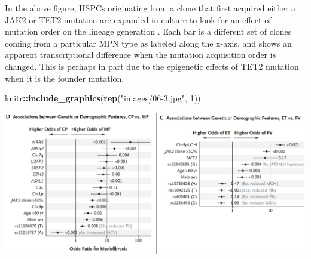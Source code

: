 \documentclass[]{book}
\newenvironment{Shaded}{\begin{snugshade}}{\end{snugshade}}
\newcommand{\KeywordTok}[1]{\textcolor[rgb]{0.13,0.29,0.53}{\textbf{#1}}}
\newcommand{\DataTypeTok}[1]{\textcolor[rgb]{0.13,0.29,0.53}{#1}}
\newcommand{\DecValTok}[1]{\textcolor[rgb]{0.00,0.00,0.81}{#1}}
\newcommand{\StringTok}[1]{\textcolor[rgb]{0.31,0.60,0.02}{#1}}
\newcommand{\OtherTok}[1]{\textcolor[rgb]{0.56,0.35,0.01}{#1}}
\newcommand{\OperatorTok}[1]{\textcolor[rgb]{0.81,0.36,0.00}{\textbf{#1}}}
\newcommand{\NormalTok}[1]{#1}
\begin{document}
\begin{Shaded}
\end{Shaded}

In the above figure, HSPCs originating from a clone that first acquired
either a JAK2 or TET2 mutation are expanded in culture to look for an
effect of mutation order on the lineage generation
\citep{ortmann2015effect}. Each bar is a different set of clones coming
from a particular MPN type as labeled along the x-axis, and shows an
apparent transcriptional difference when the mutation acquisition order
is changed. This is perhaps in part due to the epigenetic effects of
TET2 mutation when it is the founder mutation.

\begin{Shaded}
\begin{Highlighting}[]
\NormalTok{knitr}\OperatorTok{::}\KeywordTok{include_graphics}\NormalTok{(}\KeywordTok{rep}\NormalTok{(}\StringTok{"images/06-3.jpg"}\NormalTok{, }\DecValTok{1}\NormalTok{))          }
\end{Highlighting}
\end{Shaded}

\includegraphics{images/06-3.jpg}

\begin{Shaded}
\end{Shaded}
\end{document}

